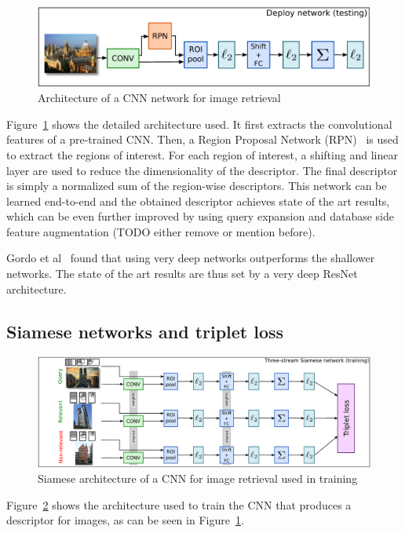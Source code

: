\begin{figure}
\includegraphics[width=\textwidth]{img/gordo_deepimageretrievaldeploy.png}
\caption{Architecture of a CNN network for image retrieval
\label{fig:gordo_deploy}}
\end{figure}
Figure~\ref{fig:gordo_deploy} shows the detailed architecture used.
It first extracts the convolutional features of a pre-trained
CNN. Then, a Region Proposal Network (RPN)~\cite{ren_faster_2015} is
used to extract the regions of interest. For each region of interest,
a shifting and linear layer are used to reduce the dimensionality of
the descriptor. The final descriptor is simply a normalized sum of the
region-wise descriptors. This network can be learned end-to-end and
the obtained descriptor achieves state of the art results, which can
be even further improved by using query expansion and database side
feature augmentation (TODO either remove or mention before).

Gordo et al~\cite{gordo_deep_2016} found that using very deep networks
outperforms the shallower networks. The state of the art results are
thus set by a very deep ResNet architecture.

\subsection{Siamese networks and triplet loss}
\begin{figure}
\includegraphics[width=\textwidth]{img/gordo_deepimageretrievalarc.png}
\caption{Siamese architecture of a CNN for image retrieval used in training
\label{fig:gordo_train}}
\end{figure}

Figure~\ref{fig:gordo_train} shows the architecture used to train the CNN
that produces a descriptor for images, as can be seen in
Figure~\ref{fig:gordo_deploy}.

